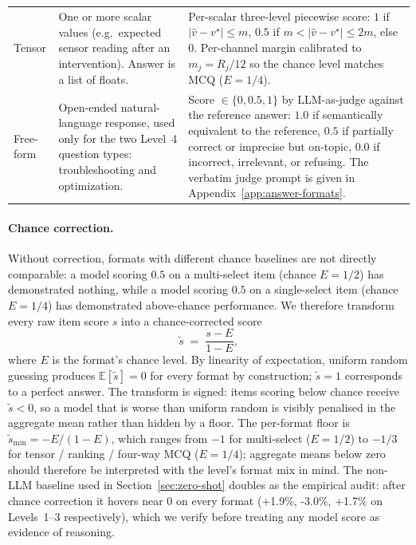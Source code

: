 \begin{table}[htbp]
\begin{tabular}{@{}l p{4.6cm} p{6.2cm}@{}}
        \addlinespace
        Tensor            & One or more scalar values (e.g.\ expected sensor reading after an intervention). Answer is a list of floats.                         & Per-scalar three-level piecewise score: $1$ if $|\hat{v}-v^{\star}|\!\leq\! m$, $0.5$ if $m\!<\!|\hat{v}-v^{\star}|\!\leq\!2m$, else $0$. Per-channel margin calibrated to $m_j = R_j/12$ so the chance level matches MCQ ($E = 1/4$).                                                                                   \\
        \addlinespace
        Free-form         & Open-ended natural-language response, used only for the two Level~4 question types: troubleshooting and optimization.                & Score $\in\{0, 0.5, 1\}$ by LLM-as-judge against the reference answer: $1.0$ if semantically equivalent to the reference, $0.5$ if partially correct or imprecise but on-topic, $0.0$ if incorrect, irrelevant, or refusing. The verbatim judge prompt is given in Appendix~\ref{app:answer-formats}. \\
        \bottomrule
    \end{tabular}
\end{table}

\paragraph{Chance correction.} Without correction, formats with different chance baselines are not directly comparable: a model scoring $0.5$ on a multi-select item (chance $E=1/2$) has demonstrated nothing, while a model scoring $0.5$ on a single-select item (chance $E=1/4$) has demonstrated above-chance performance. We therefore transform every raw item score $s$ into a chance-corrected score
\begin{equation*}
    \tilde{s} \;=\; \frac{s - E}{1 - E},
\end{equation*}
where $E$ is the format's chance level. By linearity of expectation, uniform random guessing produces $\mathbb{E}[\tilde{s}] = 0$ for every format by construction; $\tilde{s} = 1$ corresponds to a perfect answer. The transform is signed: items scoring below chance receive $\tilde{s} < 0$, so a model that is worse than uniform random is visibly penalised in the aggregate mean rather than hidden by a floor. The per-format floor is $\tilde{s}_{\min} = -E/(1-E)$, which ranges from $-1$ for multi-select ($E=1/2$) to $-1/3$ for tensor / ranking / four-way MCQ ($E=1/4$); aggregate means below zero should therefore be interpreted with the level's format mix in mind. The non-LLM baseline used in Section~\ref{sec:zero-shot} doubles as the empirical audit: after chance correction it hovers near $0$ on every format (+1.9\%, -3.0\%, +1.7\% on Levels~1--3 respectively), which we verify before treating any model score as evidence of reasoning.


